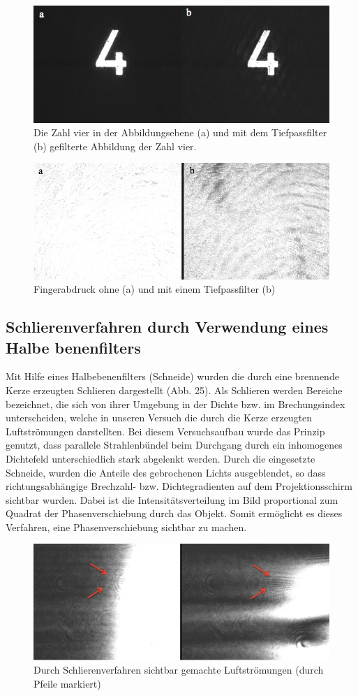 \begin{figure}[h]
	\centering
	\includegraphics[width=0.10\linewidth]{Regina/abb23}
	\caption[Zahl 4 mit Tiefpassfilter]{ Die Zahl vier in der Abbildungsebene (a) und mit dem Tiefpassfilter (b) gefilterte 
	Abbildung der Zahl vier. }
	\label{fig:vier_mit_tiefpass}
\end{figure}

\begin{figure}[h]
	\centering
	\includegraphics[width=0.10\linewidth]{Regina/abb24}
	\caption[Abbildung Fingerabdruck mit Tiefpassfilter]{Fingerabdruck ohne (a) und mit einem Tiefpassfilter (b)}
	\label{fig:fingerabdruck_mit_filtern}
\end{figure}

\subsection{Schlierenverfahren durch Verwendung eines Halbe
	benenfilters}

Mit Hilfe eines Halbebenenfilters (Schneide) wurden die durch   eine brennende Kerze erzeugten Schlieren dargestellt (Abb. 25). Als Schlieren werden Bereiche bezeichnet, die sich von ihrer Umgebung  in  der  Dichte  bzw.  im  Brechungsindex  unterscheiden,  welche  in  unseren Versuch die durch  die  Kerze erzeugten Luftströmungen darstellten. Bei diesem Versuchsaufbau  wurde  das  Prinzip  genutzt,  dass  parallele  Strahlenbündel  beim  Durchgang 
durch   ein   inhomogenes Dichtefeld   unterschiedlich   stark   abgelenkt   werden.   Durch   die eingesetzte  Schneide,  wurden  die  Anteile  des  gebrochenen  Lichts  ausgeblendet,  so  dass 
richtungsabhängige  Brechzahl-  bzw.  Dichtegradienten auf  dem  Projektionsschirm  sichtbar wurden. Dabei ist die Intensitätsverteilung im   Bild   proportional   zum   Quadrat   der Phasenverschiebung   durch   das   Objekt.   Somit   ermöglicht es dieses Verfahren, eine Phasenverschiebung sichtbar zu machen. 

\begin{figure}[h]
	\centering
	\includegraphics[width=0.10\linewidth]{Regina/abb25}
	\caption[Durch Schlierenverfahren sichtbar gemachte Luftströmungen]{Durch Schlierenverfahren sichtbar gemachte Luftströmungen (durch Pfeile markiert)}
	\label{fig:luftströmungen}
\end{figure}

